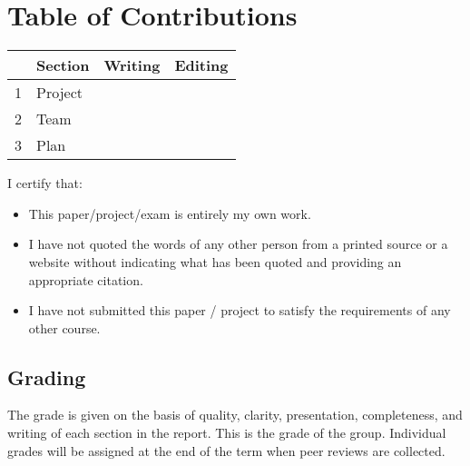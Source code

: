 \documentclass{report}
\begin{document}
\section*{\centering Table of Contributions}
\begin{tabular}{| l | l | l | l |}
    \hline
     & Section & Writing & Editing \\
    \hline \hline
    1 & Project & & \\ \hline
    2 & Team & & \\ \hline
    3 & Plan & & \\ \hline
\end{tabular}
\newpage
\noindent I certify that:
\begin{itemize}
\item This paper/project/exam is entirely my own work.
\item I have not quoted the words of any other person from a printed source or a website without indicating what has been quoted and providing an appropriate citation.
\item I have not submitted this paper / project to satisfy the requirements of any other course.
\end{itemize}

\vspace{1cm}
\noindent{}


\vspace{0.5cm}
\noindent{}

\vspace{0.5cm}
\noindent{}

\vspace{0.5cm}
\noindent{}

\vspace{0.5cm}
\noindent{}
\vspace{\fill}
\subsection*{Grading}
The grade is given on the basis of quality, clarity, presentation, completeness, and writing of each section in the report. This is the grade of the group. Individual grades will be assigned at the end of the term when peer reviews are collected.
\end{document}
